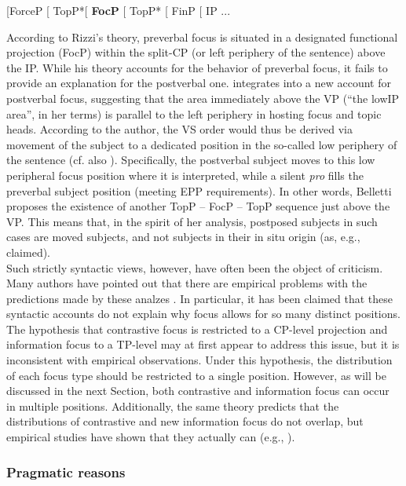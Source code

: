 \ea{} \label{ex:2:5}
[ForceP [ TopP*[ \textbf{FocP} [ TopP* [ FinP [ IP ...
\z

According to Rizzi’s theory, preverbal focus is situated in a designated functional projection (FocP) within the split-CP (or left periphery of the sentence) above the IP. While his theory accounts for the behavior of preverbal focus, it fails to provide an explanation for the postverbal one. \textcite{belletti2001inversion, belletti2004aspects, belletti2008answering, belletti2008cp} integrates \textcite{rizzi1997fine} into a new account for postverbal focus, suggesting that  the  area  immediately  above  the  VP  (``the  lowIP area”, in her terms) is parallel to the left periphery in hosting focus and topic heads. According to the author, 
the VS order would thus be derived via movement of the subject to a dedicated position in the so-called low periphery of the sentence (cf.  also \cite{cardinaletti2004toward}).
Specifically, the postverbal subject moves to this low peripheral focus position where it is interpreted, while a silent \textit{pro} fills the preverbal subject position (meeting EPP requirements). In other words, Belletti proposes the existence of another TopP – FocP – TopP sequence just above the VP. This means that, in the spirit of her analysis, postposed subjects in such cases are moved subjects, and not subjects in their in situ origin (as, e.g., \cite{burzio1986italian} claimed).\\
Such strictly syntactic views, however, have often been the object of criticism. Many authors have pointed out that there are empirical problems with the predictions made by these analzes \parencite{samek2009topic}. In particular, it has been claimed that these syntactic accounts do not explain why focus allows for so many distinct positions. The hypothesis that contrastive focus is restricted to a CP-level projection and information focus to a TP-level \parencite{belletti2004aspects} may at first appear to address this issue, but it is inconsistent with empirical observations. Under this  hypothesis, the  distribution  of  each  focus type  should  be restricted to a single position. However, as will be discussed in the next Section, both contrastive and information focus can occur in multiple positions. Additionally, the same theory predicts that the distributions of contrastive and new information focus do not overlap, but empirical studies have shown that they actually can (e.g., \cite{brunetti2009italian}).

\subsubsection{Pragmatic reasons}

